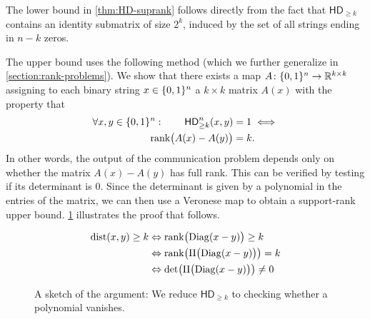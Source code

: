 \documentclass[conference]{IEEEtran}
\newcommand{\Diag}{\mathrm{Diag}}
\DeclareMathOperator{\rank}{rank}
\newcommand{\HD}[1]{\mathsf{HD}_{#1}}
\begin{document}
The lower bound in \cref{thm:HD-suprank} follows directly from the fact that $\HD{\geq k}$ contains an identity submatrix of size $2^k$, induced by the set of all strings ending in $n-k$ zeros. 

The upper bound uses the following method (which we further generalize in \cref{section:rank-problems}). We show that there exists a map $A \colon \{0,1\}^n \to \mathbb{R}^{k \times k}$ assigning to each binary string $x\in \{0,1\}^n$ a $k\times k$ matrix $A(x)$ with the property that
\begin{align}
\label{eq:intro-hd-rankproblem}
    \forall x,y \in \zo^n \,\colon\qquad \HD{\geq k}^n(x,y) &= 1 \iff\\
    \rank\!\big( A(x) - A(y) \big) &= k.\notag
\end{align}
In other words, the output of the communication problem depends only on whether the matrix $A(x)-A(y)$ has full rank. This can be verified by testing if its determinant is $0$. Since the determinant is given by a polynomial in the entries of the matrix, we can then use a Veronese map to obtain a support-rank upper bound. \cref{fig:khd-proof} illustrates the proof that follows.

\begin{figure}[H]
	\begin{center}
		
	\end{center}
        {\color{captioncolor}
	\begin{align*}
	\dist(x,y) \geq k &\Leftrightarrow \rank\!\big(\Diag(x-y)\big)\geq k\\
    &\Leftrightarrow\rank\!\big(\Pi\big(\Diag(x-y)\big)\big) = k\\
    &\Leftrightarrow \det\!\big(\Pi\big(\Diag(x-y)\big)\big) \neq 0
	\end{align*}
        }
        \caption{A sketch of the argument: We reduce $\HD{\geq k}$ to checking whether a polynomial vanishes.}
        \label{fig:khd-proof}
\end{figure}
\end{document}

